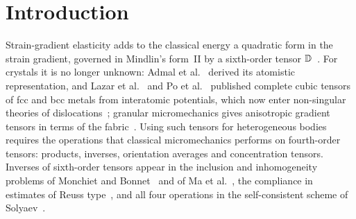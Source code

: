 \section{Introduction}\label{sec:intro}

Strain-gradient elasticity adds to the classical energy a quadratic form in the strain
gradient, governed in Mindlin's form~II by a sixth-order tensor
$\mathbb{D}$~\cite{Mindlin1964,MindlinEshel1968}. For crystals it is no longer unknown: Admal et al.~\cite{Admal2017} derived its atomistic
representation, and Lazar et al.~\cite{Lazar2022} and Po et al.~\cite{Po2019} published
complete cubic tensors of fcc and bcc metals from interatomic potentials, which now enter non-singular theories of dislocations~\cite{Po2018,Lazar2024};
granular micromechanics gives anisotropic gradient tensors in terms of the
fabric~\cite{Pirmoradi2024}. Using such tensors for heterogeneous bodies
requires the operations that classical micromechanics performs on
fourth-order tensors: products, inverses, orientation averages and concentration tensors.
Inverses of sixth-order tensors appear in the inclusion and inhomogeneity problems of
Monchiet and Bonnet~\cite{Monchiet2011a,Monchiet2013,Monchiet2015} and of Ma et al.~\cite{Ma2018},
the compliance in estimates of Reuss type~\cite{Nazarenko2021a}, and all four operations
in the self-consistent scheme of Solyaev~\cite{Solyaev2023}.

